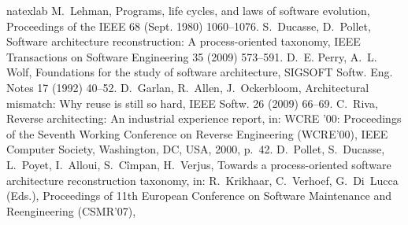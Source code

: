 \documentclass[preprint,12pt]{elsarticle}
\begin{document}
\begin{thebibliography}{39}
\expandafter\ifx\csname natexlab\endcsname\relax\def\natexlab#1{#1}\fi
\providecommand{\bibinfo}[2]{#2}
\ifx\xfnm\relax \def\xfnm[#1]{\unskip,\space#1}\fi
\bibinfo{author}{M.~Lehman},
\newblock \bibinfo{title}{Programs, life cycles, and laws of software
  evolution},
\newblock \bibinfo{journal}{Proceedings of the IEEE} \bibinfo{volume}{68}
  (\bibinfo{year}{Sept. 1980}) \bibinfo{pages}{1060--1076}.
\bibinfo{author}{S.~Ducasse}, \bibinfo{author}{D.~Pollet},
\newblock \bibinfo{title}{Software architecture reconstruction: A
  process-oriented taxonomy},
\newblock \bibinfo{journal}{IEEE Transactions on Software Engineering}
  \bibinfo{volume}{35} (\bibinfo{year}{2009}) \bibinfo{pages}{573--591}.
\bibinfo{author}{D.~E. Perry}, \bibinfo{author}{A.~L. Wolf},
\newblock \bibinfo{title}{Foundations for the study of software architecture},
\newblock \bibinfo{journal}{SIGSOFT Softw. Eng. Notes} \bibinfo{volume}{17}
  (\bibinfo{year}{1992}) \bibinfo{pages}{40--52}.
\bibinfo{author}{D.~Garlan}, \bibinfo{author}{R.~Allen},
  \bibinfo{author}{J.~Ockerbloom},
\newblock \bibinfo{title}{Architectural mismatch: Why reuse is still so hard},
\newblock \bibinfo{journal}{IEEE Softw.} \bibinfo{volume}{26}
  (\bibinfo{year}{2009}) \bibinfo{pages}{66--69}.
\bibinfo{author}{C.~Riva},
\newblock \bibinfo{title}{Reverse architecting: An industrial experience
  report},
\newblock in: \bibinfo{booktitle}{WCRE '00: Proceedings of the Seventh Working
  Conference on Reverse Engineering (WCRE'00)}, \bibinfo{publisher}{IEEE
  Computer Society}, \bibinfo{address}{Washington, DC, USA},
  \bibinfo{year}{2000}, p.~\bibinfo{pages}{42}.
\bibinfo{author}{D.~Pollet}, \bibinfo{author}{S.~Ducasse},
  \bibinfo{author}{L.~Poyet}, \bibinfo{author}{I.~Alloui},
  \bibinfo{author}{S.~C\^impan}, \bibinfo{author}{H.~Verjus},
\newblock \bibinfo{title}{Towards a process-oriented software architecture
  reconstruction taxonomy},
\newblock in: \bibinfo{editor}{R.~Krikhaar}, \bibinfo{editor}{C.~Verhoef},
  \bibinfo{editor}{G.~Di~Lucca} (Eds.), \bibinfo{booktitle}{Proceedings of 11th
  European Conference on Software Maintenance and Reengineering (CSMR'07)},

\end{thebibliography}
\end{document}
